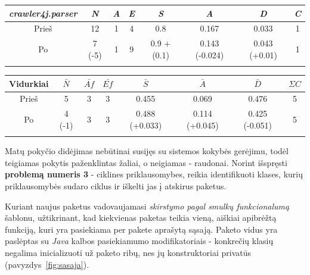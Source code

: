 \begin{center}
    \begin{tabular}{|c|c|c|c|c|c|c|c|}
        \hline
        \textit{crawler4j.parser} & \textit{N} & \textit{A} & \textit{E} & \textit{S} & \textit{A} & \textit{D} & \textit{C} \\ [0.5ex]
        \hline\hline
        Prieš & 12 & 1 & 4 & 0.8 & 0.167 & 0.033 & 1 \\
        \hline
        Po & \cellcolor{green!25} 7 (-5) & 1 & 9 & \cellcolor{red!25} 0.9 + (0.1) & \cellcolor{red!25} 0.143 (-0.024) & \cellcolor{red!25} 0.043 (+0.01) & 1 \\
        \hline
        \label{table:parser}
    \end{tabular}
    \begin{tabular}{|c|c|c|c|c|c|c|c|}
        \hline
        Vidurkiai & $\bar{N}$ & $\bar{Af}$ & $\bar{Ef}$ & $\bar{S}$ & $\bar{A}$ & $\bar{D}$ & $\Sigma C$ \\ [0.5ex]
        \hline\hline
        Prieš & 5 & 3 & 3 & 0.455 & 0.069 & 0.476 & 5\\
        \hline
        Po & \cellcolor{green!25} 4 (-1) & 3 & 3 & \cellcolor{red!25} 0.488 (+0.033) & \cellcolor{green!25} 0.114 (+0.045) & \cellcolor{green!25} 0.425 (-0.051) & 5 \\
        \hline
        \label{table:parsers}
    \end{tabular}
\end{center}
Matų pokyčio didėjimas nebūtinai susijęs su sistemos kokybės gerėjimu, todėl teigiamas pokytis paženklintas žaliai, o neigiamas - raudonai.
Norint išspręsti \textbf{problemą numeris 3} - ciklines priklausomybes, reikia identifikuoti klases, kurių priklausomybės
sudaro ciklus ir iškelti jas į atskirus paketus.

Kuriant naujus paketus vadovaujamasi \textit{skirstymo pagal smulkų funkcionalumą} šablonu, užtikrinant, kad kiekvienas
paketas teikia vieną, aiškiai apibrėžtą funkciją, kuri yra pasiekiama per pakete aprašytą sąsają.
Paketo vidus yra paslėptas su \textit{Java} kalbos pasiekiamumo modifikatoriais - konkrečių klasių negalima inicializuoti už paketo ribų,
nes jų konstruktoriai privatūs (pavyzdys~\ref{fig:sasaja}).

